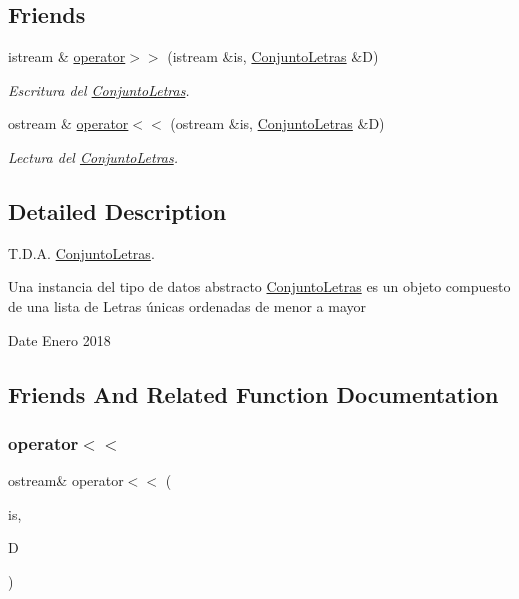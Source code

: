 \subsection*{Friends}
\begin{DoxyCompactItemize}
\item 
istream \& \mbox{\hyperlink{classConjuntoLetras_af608a83f506727554afbe72099b53e8d}{operator$>$$>$}} (istream \&is, \mbox{\hyperlink{classConjuntoLetras}{Conjunto\+Letras}} \&D)
\begin{DoxyCompactList}\small\item\em Escritura del \mbox{\hyperlink{classConjuntoLetras}{Conjunto\+Letras}}. \end{DoxyCompactList}\item 
ostream \& \mbox{\hyperlink{classConjuntoLetras_ad239a60f3fbf6ff49760196ab27c5f3d}{operator$<$$<$}} (ostream \&is, \mbox{\hyperlink{classConjuntoLetras}{Conjunto\+Letras}} \&D)
\begin{DoxyCompactList}\small\item\em Lectura del \mbox{\hyperlink{classConjuntoLetras}{Conjunto\+Letras}}. \end{DoxyCompactList}\end{DoxyCompactItemize}


\subsection{Detailed Description}
T.\+D.\+A. \mbox{\hyperlink{classConjuntoLetras}{Conjunto\+Letras}}. 

Una instancia del tipo de datos abstracto {\ttfamily \mbox{\hyperlink{classConjuntoLetras}{Conjunto\+Letras}}} es un objeto compuesto de una lista de Letras únicas ordenadas de menor a mayor

\begin{DoxyDate}{Date}
Enero 2018 
\end{DoxyDate}


\subsection{Friends And Related Function Documentation}
\mbox{\label{classConjuntoLetras_ad239a60f3fbf6ff49760196ab27c5f3d}} 
\subsubsection{\texorpdfstring{operator$<$$<$}{operator<<}}
{\footnotesize\ttfamily ostream\& operator$<$$<$ (\begin{DoxyParamCaption}\item[{ostream \&}]{is,  }\item[{\mbox{\hyperlink{classConjuntoLetras}{Conjunto\+Letras}} \&}]{D }\end{DoxyParamCaption})\hspace{0.3cm}{\ttfamily [friend]}}



